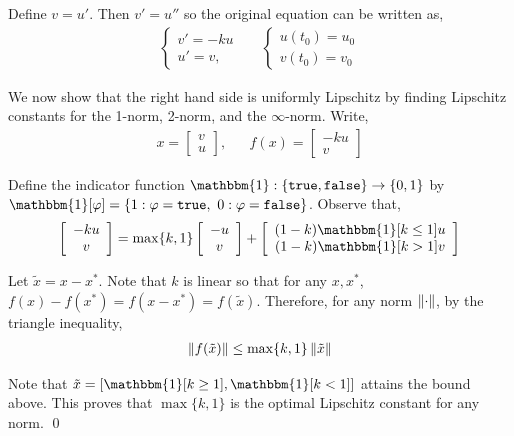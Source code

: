 \documentclass[10pt]{article}
\begin{document}
\begin{solution}[Solution]

Define \( v = u' \). Then \( v' = u'' \) so the original equation can be written as,
\begin{align*}
    \begin{cases}
        v' = - k u \\
        u' = v,
    \end{cases}
    &&
    \begin{cases}
        u(t_0) = u_0 \\
        v(t_0) = v_0
    \end{cases}
\end{align*}

We now show that the right hand side is uniformly Lipschitz by finding Lipschitz constants for the 1-norm, 2-norm, and the \( \infty \)-norm.
Write,
\begin{align*}
    x = \left[\begin{array}{c} v \\ u\end{array}\right], && f(x) = \left[\begin{array}{c}-ku \\ v\end{array}\right]
\end{align*}

Define the indicator function \( \mathbbm{1}:\{\verb|true|,\verb|false|\}\to\{0,1\} \) by \( \mathbbm{1}[\varphi] = \{ 1 : \varphi = \verb|true|,~ 0: \varphi = \verb|false| \} \). Observe that,
\begin{align*}
    \left[\begin{array}{c}-ku \\ v\end{array}\right] = \max\{k,1\}\left[\begin{array}{c}-u \\ v\end{array}\right] + \left[\begin{array}{c} (1-k)\mathbbm{1}[k\leq1] u \\ (1-k)\mathbbm{1}[k>1]v \end{array}\right]
\end{align*}

Let \( \tilde{x} = x - x^* \).
Note that \( k \) is linear so that for any \( x,x^* \), \( f(x) - f(x^*) = f(x-x^*) = f(\tilde{x}) \).
Therefore, for any norm \( \left\lVert\cdot\right\rVert \), by the triangle inequality,
\begin{align*}
    \left\lVert f(\tilde{x})\right\rVert \leq \max\{k,1\}\left\lVert\tilde{x}\right\rVert
\end{align*}

Note that \( \tilde{x} = [\mathbbm{1}[k\geq 1], \mathbbm{1}[k < 1]] \) attains the bound above.
This proves that \( \max\{k,1\} \) is the optimal Lipschitz constant for any norm. \qed

\end{solution}
\end{document}
